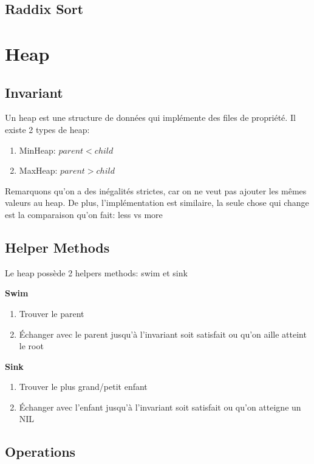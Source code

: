 \documentclass{article}
\begin{document}
\subsection{Raddix Sort}

\section{Heap}

\subsection{Invariant}%
\label{sub:Invariant}

Un heap est une structure de données qui implémente des files de propriété.
Il existe 2 types de heap:
\begin{enumerate}
    \item MinHeap: $ parent < child $
    \item MaxHeap: $ parent > child $
\end{enumerate}

Remarquons qu'on a des inégalités strictes, car on ne veut pas ajouter
les mêmes valeurs au heap. De plus, l'implémentation est similaire,
la seule chose qui change est la comparaison qu'on fait: less vs more

\subsection{Helper Methods}%
\label{sub:Helper Methods}

Le heap possède 2 helpers methods: swim et sink

\textbf{Swim}

\begin{enumerate}
    \item Trouver le parent
    \item Échanger avec le parent jusqu'à l'invariant soit satisfait
	ou qu'on aille atteint le root
\end{enumerate}

\textbf{Sink}

\begin{enumerate}
    \item Trouver le plus grand/petit enfant
    \item Échanger avec l'enfant jusqu'à l'invariant soit satisfait
	ou qu'on atteigne un NIL
\end{enumerate}

\subsection{Operations}%
\label{sub:Operations}
\end{document}
